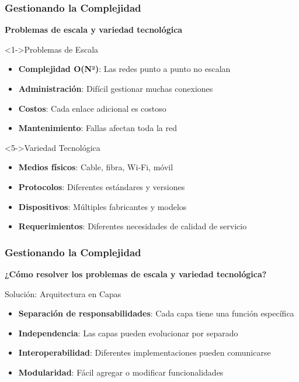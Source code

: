 \documentclass[aspectratio=169]{beamer}
\begin{document}
\begin{frame}
\frametitle{Gestionando la Complejidad}

\begin{center}
\Large \textbf{Problemas de escala y variedad tecnológica}
\end{center}

\begin{block}<1->{Problemas de Escala}
\begin{itemize}
\item<1-> \textbf{Complejidad O(N²)}: Las redes punto a punto no escalan
\item<2-> \textbf{Administración}: Difícil gestionar muchas conexiones
\item<3-> \textbf{Costos}: Cada enlace adicional es costoso
\item<4-> \textbf{Mantenimiento}: Fallas afectan toda la red
\end{itemize}
\end{block}

\begin{block}<5->{Variedad Tecnológica}
\begin{itemize}
\item<5-> \textbf{Medios físicos}: Cable, fibra, Wi-Fi, móvil
\item<6-> \textbf{Protocolos}: Diferentes estándares y versiones
\item<7-> \textbf{Dispositivos}: Múltiples fabricantes y modelos
\item<8-> \textbf{Requerimientos}: Diferentes necesidades de calidad de servicio
\end{itemize}
\end{block}
\end{frame}

\begin{frame}
\frametitle{Gestionando la Complejidad}

\begin{center}
\Large \textbf{¿Cómo resolver los problemas de escala y variedad tecnológica?}
\end{center}

\begin{block}{Solución: Arquitectura en Capas}
\begin{itemize}
\item<1-> \textbf{Separación de responsabilidades}: Cada capa tiene una función específica
\item<2-> \textbf{Independencia}: Las capas pueden evolucionar por separado
\item<3-> \textbf{Interoperabilidad}: Diferentes implementaciones pueden comunicarse
\item<4-> \textbf{Modularidad}: Fácil agregar o modificar funcionalidades
\end{itemize}
\end{block}
\end{frame}
\end{document}
